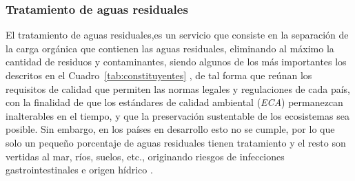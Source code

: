 \subsubsection*{Tratamiento de aguas residuales}
El tratamiento de aguas residuales,es un servicio que consiste en la separación de la carga orgánica que contienen las aguas residuales, eliminando al máximo la cantidad de residuos y contaminantes, siendo algunos de los más importantes los descritos en el Cuadro~\ref{tab:constituyentes} \citep{tratGOB, ron}, de tal forma que reúnan los requisitos de calidad que permiten las normas legales y regulaciones de cada país, con la finalidad de que los estándares de calidad ambiental (\emph{ECA}) permanezcan inalterables en el tiempo, y que la preservación sustentable de los ecosistemas sea posible. Sin embargo, en los países en desarrollo esto no se cumple, por lo que solo un pequeño porcentaje de aguas residuales tienen tratamiento y el resto son vertidas al mar, ríos, suelos, etc., originando riesgos de infecciones gastrointestinales e origen hídrico \citep{carreno17}.\par
